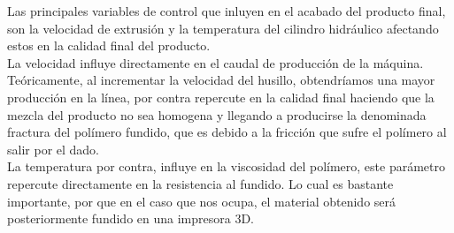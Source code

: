Las principales variables de control que inluyen en el acabado del producto final, son la velocidad de extrusión y la temperatura del cilindro hidráulico afectando estos en la calidad final del producto.\\

La velocidad influye directamente en el caudal de producción de la máquina. Teóricamente, al incrementar la velocidad del husillo, obtendríamos una mayor producción en la línea, por contra repercute en la calidad final haciendo que la mezcla del producto no sea homogena y llegando a producirse la denominada fractura del polímero fundido, que es debido a la fricción que sufre el polímero al salir por el dado.\\

La temperatura por contra, influye en la viscosidad del polímero, este parámetro repercute directamente en la resistencia al fundido. Lo cual es bastante importante, por que en el caso que nos ocupa, el  material obtenido será posteriormente fundido en una impresora 3D.\\

